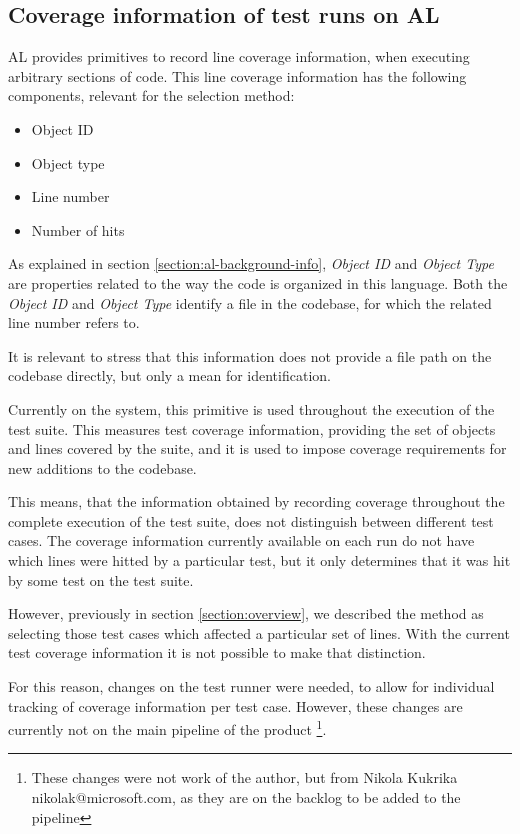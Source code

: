 \documentclass{article}
\begin{document}
\subsection{Coverage information of test runs on AL}\label{section:cov-info}
AL provides primitives to record line coverage information, when executing arbitrary sections of code. This line coverage information has the following components, relevant for the selection method:
\begin{itemize}
\item Object ID
\item Object type
\item Line number
\item Number of hits
\end{itemize}

As explained in section \ref{section:al-background-info}, \emph{Object ID} and \emph{Object Type} are properties related to the way the code is organized in this language. Both the \emph{Object ID} and \emph{Object Type} identify a file in the codebase, for which the related line number refers to.

It is relevant to stress that this information does not provide a file path on the codebase directly, but only a mean for identification.

Currently on the system, this primitive is used throughout the execution of the test suite. This measures test coverage information, providing the set of objects and lines covered by the suite, and it is used to impose coverage requirements for new additions to the codebase.

This means, that the information obtained by recording coverage throughout the complete execution of the test suite, does not distinguish between different test cases. The coverage information currently available on each run do not have which lines were hitted by a particular test, but it only determines that it was hit by some test on the test suite.

However, previously in section \ref{section:overview}, we described the method as selecting those test cases which affected a particular set of lines. With the current test coverage information it is not possible to make that distinction.

For this reason, changes on the test runner were needed, to allow for individual tracking of coverage information per test case. However, these changes are currently not on the main pipeline of the product \footnote{These changes were not work of the author, but from Nikola Kukrika nikolak@microsoft.com, as they are on the backlog to be added to the pipeline}.
\end{document}
